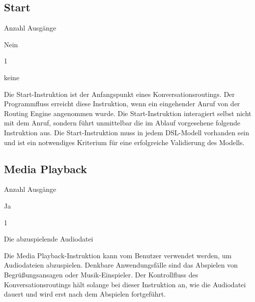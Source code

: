 \subsection{Start}
\label{subsec:start}
\begin{labeling}{Anzahl Ausgänge}
\item [Eingang] Nein
\item [Anzahl Ausgänge] 1
\item [Parameter] keine
\item [Beschreibung] Die Start-Instruktion ist der Anfangspunkt eines Konversationsroutings. Der Programmfluss erreicht diese Instruktion, wenn ein eingehender Anruf von der Routing Engine angenommen wurde. Die Start-Instruktion interagiert selbst nicht mit dem Anruf, sondern führt unmittelbar die im Ablauf vorgesehene folgende Instruktion aus. Die Start-Instruktion muss in jedem DSL-Modell vorhanden sein und ist ein notwendiges Kriterium für eine erfolgreiche Validierung des Modells. 
\end{labeling}

\subsection{Media Playback}
\label{subsec:Media Playback}
\begin{labeling}{Anzahl Ausgänge}
\item [Eingang] Ja
\item [Anzahl Ausgänge] 1
\item [Parameter] Die abzuspielende Audiodatei
\item [Beschreibung] Die Media Playback-Instruktion kann vom Benutzer verwendet werden, um Audiodateien abzuspielen. Denkbare Anwendungsfälle sind das Abspielen von Begrüßungsansagen oder Musik-Einspieler. Der Kontrollfluss des Konversationsroutings hält solange bei dieser Instruktion an, wie die Audiodatei dauert und wird erst nach dem Abspielen fortgeführt.
\end{labeling}

